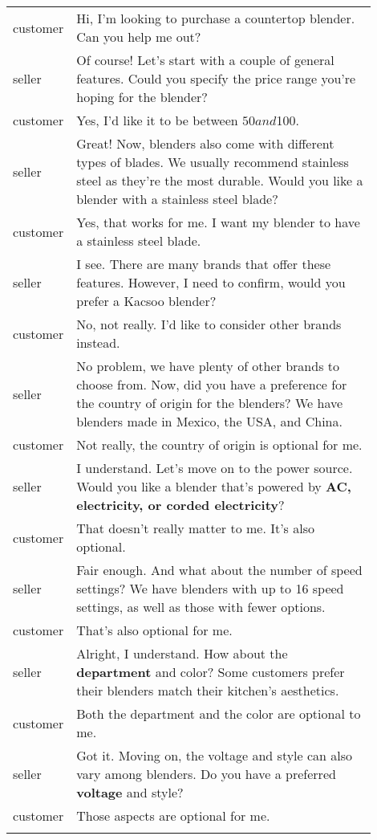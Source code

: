 \begin{table*}[t]
\begin{center}
\begin{tabular}{l p{0.9\linewidth} }
customer& Hi, I'm looking to purchase a countertop blender. Can you help me out?\\\hdashline
seller& Of course! Let's start with a couple of general features. Could you specify the price range you're hoping for the blender?\\\hdashline
customer& Yes, I'd like it to be between $50 and $100.\\\hdashline
seller& Great! Now, blenders also come with different types of blades. We usually recommend stainless steel as they're the most durable. Would you like a blender with a stainless steel blade?\\\hdashline
customer& Yes, that works for me. I want my blender to have a stainless steel blade.\\\hdashline
seller& I see. There are many brands that offer these features. However, I need to confirm, would you prefer a Kacsoo blender?\\\hdashline
customer& No, not really. I'd like to consider other brands instead.\\\hdashline
seller& No problem, we have plenty of other brands to choose from. Now, did you have a preference for the country of origin for the blenders? We have blenders made in Mexico, the USA, and China.\\\hdashline
customer& Not really, the country of origin is optional for me.\\\hdashline
 seller& I understand. Let's move on to the power source. Would you like a blender that's powered by \textbf{AC, electricity, or corded electricity}?\\\hdashline
 customer& That doesn't really matter to me. It's also optional.\\\hdashline
 seller& Fair enough. And what about the number of speed settings? We have blenders with up to 16 speed settings, as well as those with fewer options.\\\hdashline
customer& That's also optional for me.\\\hdashline
seller& Alright, I understand. How about the \textbf{department} and color? Some customers prefer their blenders match their kitchen's aesthetics.\\\hdashline
customer& Both the department and the color are optional to me.\\\hdashline
seller& Got it. Moving on, the voltage and style can also vary among blenders. Do you have a preferred \textbf{voltage} and style?\\\hdashline
customer& Those aspects are optional for me.\\\hdashline

\end{tabular}
\end{center}
\end{table*}
